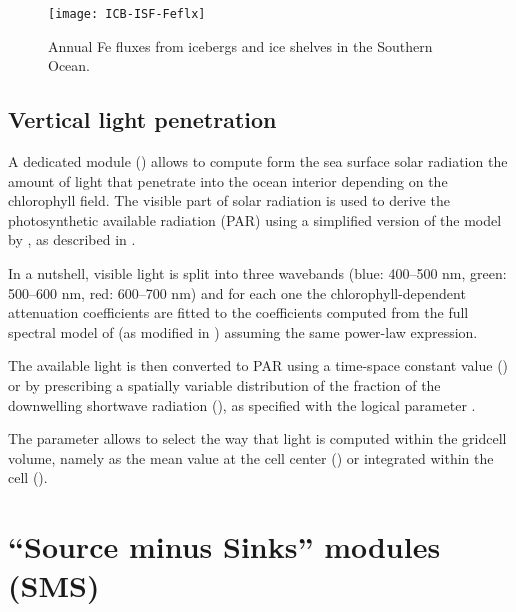 \documentclass[../main/TOP_manual]{subfiles}
\begin{document}
\begin{figure}[!h]
	\centering
	\texttt{[image: ICB-ISF-Feflx]}
	\caption{Annual Fe fluxes from icebergs and ice shelves in the Southern Ocean.}
	\label{img_icbisf}
\end{figure}


\subsection{Vertical light penetration}

A dedicated module () allows to compute form the sea surface solar radiation the amount of light that penetrate into the ocean interior depending on the chlorophyll field. 
The visible part of solar radiation is used to derive the photosynthetic available radiation (PAR) using a simplified version of the model by \cite{morel_1988}, as described in \cite{lengaigne_2007}. 

In a nutshell, visible light is split into three wavebands (blue: 400–500 nm, green: 500–600 nm, red: 600–700 nm) and for each one the chlorophyll-dependent attenuation coefficients are fitted 
to the coefficients computed from the full spectral model of \cite{morel_1988} (as modified in \cite{morel_2001}) assuming the same power-law expression. 

The available light is then converted to PAR using a time-space constant value () or 
by prescribing a spatially variable distribution of the fraction of the downwelling shortwave radiation (), 
as specified with the logical parameter .

The  parameter allows to select the way that light is computed within the gridcell volume, namely as the mean value at the cell center () or integrated within the cell ().




\section{“Source minus Sinks” modules (SMS)}
\end{document}
